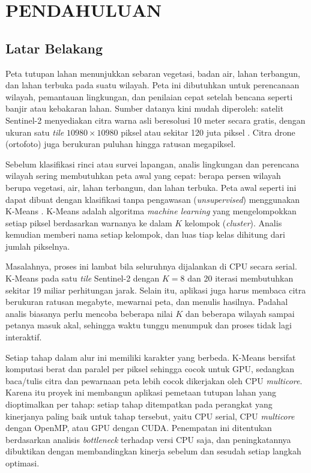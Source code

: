 \chapter{PENDAHULUAN}

\section{Latar Belakang}
Peta tutupan lahan menunjukkan sebaran vegetasi, badan air, lahan terbangun, dan lahan terbuka pada suatu wilayah. Peta ini dibutuhkan untuk perencanaan wilayah, pemantauan lingkungan, dan penilaian cepat setelah bencana seperti banjir atau kebakaran lahan. Sumber datanya kini mudah diperoleh: satelit Sentinel-2 menyediakan citra warna asli beresolusi 10 meter secara gratis, dengan ukuran satu \emph{tile} $10980\times10980$ piksel atau sekitar 120 juta piksel \cite{esa2015}. Citra drone (ortofoto) juga berukuran puluhan hingga ratusan megapiksel.

Sebelum klasifikasi rinci atau survei lapangan, analis lingkungan dan perencana wilayah sering membutuhkan peta awal yang cepat: berapa persen wilayah berupa vegetasi, air, lahan terbangun, dan lahan terbuka. Peta awal seperti ini dapat dibuat dengan klasifikasi tanpa pengawasan (\emph{unsupervised}) menggunakan K-Means \cite{richards2022}. K-Means adalah algoritma \emph{machine learning} yang mengelompokkan setiap piksel berdasarkan warnanya ke dalam $K$ kelompok (\emph{cluster}). Analis kemudian memberi nama setiap kelompok, dan luas tiap kelas dihitung dari jumlah pikselnya.

Masalahnya, proses ini lambat bila seluruhnya dijalankan di CPU secara serial. K-Means pada satu \emph{tile} Sentinel-2 dengan $K=8$ dan 20 iterasi membutuhkan sekitar 19 miliar perhitungan jarak. Selain itu, aplikasi juga harus membaca citra berukuran ratusan megabyte, mewarnai peta, dan menulis hasilnya. Padahal analis biasanya perlu mencoba beberapa nilai $K$ dan beberapa wilayah sampai petanya masuk akal, sehingga waktu tunggu menumpuk dan proses tidak lagi interaktif.

Setiap tahap dalam alur ini memiliki karakter yang berbeda. K-Means bersifat komputasi berat dan paralel per piksel sehingga cocok untuk GPU, sedangkan baca/tulis citra dan pewarnaan peta lebih cocok dikerjakan oleh CPU \emph{multicore}. Karena itu proyek ini membangun aplikasi pemetaan tutupan lahan yang dioptimalkan per tahap: setiap tahap ditempatkan pada perangkat yang kinerjanya paling baik untuk tahap tersebut, yaitu CPU serial, CPU \emph{multicore} dengan OpenMP, atau GPU dengan CUDA. Penempatan ini ditentukan berdasarkan analisis \emph{bottleneck} terhadap versi CPU saja, dan peningkatannya dibuktikan dengan membandingkan kinerja sebelum dan sesudah setiap langkah optimasi.

